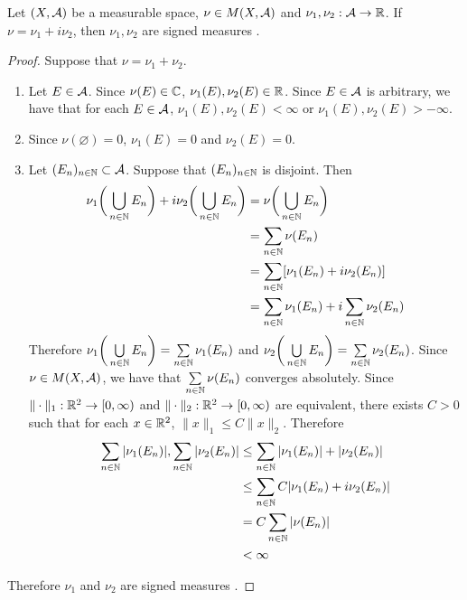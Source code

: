 \documentclass{book}
\begin{document}
	\begin{ex}  
		Let $(X, \mathcal{A})$ be a measurable space, $\nu \in M(X, \mathcal{A})$ and $\nu_1, \nu_2 :\mathcal{A} \rightarrow \mathbb{R}$. If $\nu = \nu_1 + i \nu_2$, then $\nu_1, \nu_2$ are signed measures .
	\end{ex}

	\begin{proof}
		Suppose that $\nu = \nu_1 + \nu_2$.
		\begin{enumerate}
			\item Let $E \in \mathcal{A}$. Since $\nu(E) \in \mathbb{C}$, $\nu_1(E), \nu_2(E) \in \mathbb{R}$. Since $E \in \mathcal{A}$ is arbitrary, we have that for each $E \in \mathcal{A}$, $\nu_1(E), \nu_2(E) < \infty$ or $\nu_1(E), \nu_2(E) > -\infty$.
			\item 
			Since $\nu(\varnothing) = 0$, $\nu_1(E) = 0$ and $\nu_2(E) = 0$. 
			\item Let $(E_n)_{n \in \mathbb{N}} \subset \mathcal{A}$. Suppose that $(E_n)_{n \in \mathbb{N}}$ is disjoint. Then 
			\begin{align*}
				\nu_1 \bigg( \bigcup_{n \in \mathbb{N}} E_n \bigg) + i \nu_2 \bigg( \bigcup_{n \in \mathbb{N}} E_n \bigg)
				& = \nu \bigg( \bigcup_{n \in \mathbb{N}} E_n \bigg) \\
				& = \sum\limits_{n \in \mathbb{N}} \nu(E_n) \\
				& = \sum\limits_{n \in \mathbb{N}} [\nu_1(E_n) +  i\nu_2(E_n)] \\
				& = \sum\limits_{n \in \mathbb{N}} \nu_1(E_n)  + i \sum\limits_{n \in \mathbb{N}} \nu_2(E_n) \\
			\end{align*}
			Therefore $\nu_1 \bigg( \bigcup\limits_{n \in \mathbb{N}} E_n \bigg) = \sum\limits_{n \in \mathbb{N}} \nu_1(E_n)$ and $\nu_2 \bigg( \bigcup\limits_{n \in \mathbb{N}} E_n \bigg) = \sum\limits_{n \in \mathbb{N}} \nu_2(E_n)$. Since $\nu \in M(X, \mathcal{A})$, we have that $\sum\limits_{n \in \mathbb{N}} \nu (E_n)$ converges absolutely. Since $\|\cdot\|_1 : \mathbb{R}^2 \rightarrow [0,\infty)$ and $\|\cdot\|_2: \mathbb{R}^2 \rightarrow [0,\infty)$ are equivalent, there exists $C > 0$ such that for each $x \in \mathbb{R}^2$, $\|x\|_1 \leq C \|x\|_2$. Therefore
			\begin{align*}
				\sum\limits_{n \in \mathbb{N}} |\nu_1 (E_n)|, \sum\limits_{n \in \mathbb{N}} |\nu_2 (E_n)|
				& \leq \sum\limits_{n \in \mathbb{N}} |\nu_1 (E_n)| + |\nu_2 (E_n)|  \\ 
				& \leq \sum\limits_{n \in \mathbb{N}} C |\nu_1 (E_n) +  i \nu_2 (E_n)| \\ 
				& = C \sum\limits_{n \in \mathbb{N}}  |\nu (E_n) |  \\ 
				& < \infty 
			\end{align*}
		\end{enumerate}
		Therefore $\nu_1$ and $\nu_2$ are signed measures .
	\end{proof}
\end{document}

